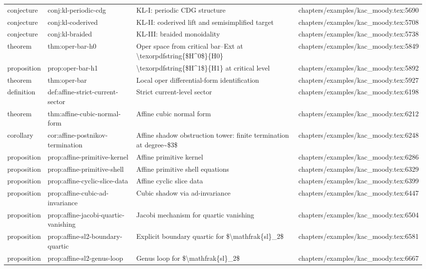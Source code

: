 \documentclass[11pt]{article}
\begin{document}
\begin{longtable}{L{0.10\textwidth}L{0.26\textwidth}L{0.42\textwidth}L{0.22\textwidth}}
conjecture & conj:kl-periodic-cdg & KL-I: periodic CDG structure & chapters/examples/kac\_moody.tex:5690\\
conjecture & conj:kl-coderived & KL-II: coderived lift and semisimplified target & chapters/examples/kac\_moody.tex:5708\\
conjecture & conj:kl-braided & KL-III: braided monoidality & chapters/examples/kac\_moody.tex:5738\\
theorem & thm:oper-bar-h0 & Oper space from critical bar--Ext at \textbackslash{}texorpdfstring\{\$H\textasciicircum{}0\$\}\{H0\} & chapters/examples/kac\_moody.tex:5849\\
proposition & prop:oper-bar-h1 & \textbackslash{}texorpdfstring\{\$H\textasciicircum{}1\$\}\{H1\} at critical level & chapters/examples/kac\_moody.tex:5892\\
theorem & thm:oper-bar & Local oper differential-form identification & chapters/examples/kac\_moody.tex:5927\\
definition & def:affine-strict-current-sector & Strict current-level sector & chapters/examples/kac\_moody.tex:6198\\
theorem & thm:affine-cubic-normal-form & Affine cubic normal form & chapters/examples/kac\_moody.tex:6212\\
corollary & cor:affine-postnikov-termination & Affine shadow obstruction tower: finite termination at degree\textasciitilde{}\$3\$ & chapters/examples/kac\_moody.tex:6248\\
proposition & prop:affine-primitive-kernel & Affine primitive kernel & chapters/examples/kac\_moody.tex:6286\\
proposition & prop:affine-primitive-shell & Affine primitive shell equations & chapters/examples/kac\_moody.tex:6329\\
proposition & prop:affine-cyclic-slice-data & Affine cyclic slice data & chapters/examples/kac\_moody.tex:6399\\
proposition & prop:affine-cubic-ad-invariance & Cubic shadow via ad-invariance & chapters/examples/kac\_moody.tex:6447\\
proposition & prop:affine-jacobi-quartic-vanishing & Jacobi mechanism for quartic vanishing & chapters/examples/kac\_moody.tex:6504\\
proposition & prop:affine-sl2-boundary-quartic & Explicit boundary quartic for \$\textbackslash{}mathfrak\{sl\}\_2\$ & chapters/examples/kac\_moody.tex:6581\\
proposition & prop:affine-sl2-genus-loop & Genus loop for \$\textbackslash{}mathfrak\{sl\}\_2\$ & chapters/examples/kac\_moody.tex:6667\\

\end{longtable}
\end{document}
